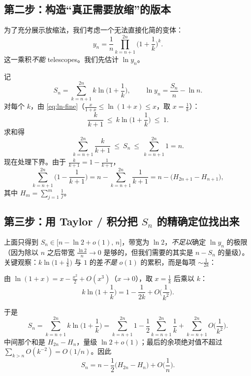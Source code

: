 \documentclass[11pt,a4paper]{ctexart}
\theoremstyle{definition}
\theoremstyle{remark}
\begin{document}
\subsection{第二步：构造“真正需要放缩”的版本}

为了充分展示放缩法，我们考虑一个无法直接化简的变体：
\begin{equation}\label{eq:xn-variant}
  y_n=\frac{1}{n}\prod_{k=n+1}^{2n}\Big(1+\frac1k\Big)^{k}.
\end{equation}
这一乘积\emph{不能} telescopes。我们先估计 $\ln y_n$。

记
\[
  S_n=\sum_{k=n+1}^{2n}k\ln\Big(1+\frac1k\Big),\qquad \ln y_n=\frac{S_n}{n}-\ln n .
\]
对每个 $k$，由 \eqref{eq:ln-fine}（$\frac{x}{1+x}\le\ln(1+x)\le x$，取 $x=\frac1k$）：
\[
  \frac{k}{k+1}\ \le\ k\ln\Big(1+\frac1k\Big)\ \le\ 1 .
\]
求和得
\[
  \sum_{k=n+1}^{2n}\frac{k}{k+1}\ \le\ S_n\ \le\ \sum_{k=n+1}^{2n}1=n .
\]
现在处理下界。由于 $\frac{k}{k+1}=1-\frac{1}{k+1}$，
\[
  \sum_{k=n+1}^{2n}\Big(1-\frac{1}{k+1}\Big)
  =n-\sum_{k=n+1}^{2n}\frac{1}{k+1}
  =n-\Big(H_{2n+1}-H_{n+1}\Big),
\]
其中 $H_m=\sum_{j=1}^{m}\frac1j$。

\subsection{第三步：用 Taylor / 积分把 $S_n$ 的精确定位找出来}

上面只得到 $S_n\in\big[n-\ln 2+o(1),\,n\big]$，带宽为 $\ln 2$，\emph{不足以}确定 $\ln y_n$
的极限（因为除以 $n$ 之后带宽 $\frac{\ln2}{n}\to0$ 是够的，但我们需要的其实是 $n-S_n$ 的量级）。
关键观察：$k\ln\big(1+\frac1k\big)$ 与 $1$ 的差\emph{不是} $o(1)$ 的累积，而是每项 $\sim\frac{1}{2k}$：

\begin{keybox}[核心展开]
由 $\ln(1+x)=x-\frac{x^2}{2}+O(x^3)$（$x\to0$），取 $x=\frac1k$ 后乘以 $k$：
\begin{equation}\label{eq:kln-expand}
  k\ln\Big(1+\frac1k\Big)
  =1-\frac{1}{2k}+O\Big(\frac{1}{k^{2}}\Big).
\end{equation}
\end{keybox}

于是
\[
  S_n=\sum_{k=n+1}^{2n}k\ln\Big(1+\frac1k\Big)
  =\sum_{k=n+1}^{2n}1-\frac12\sum_{k=n+1}^{2n}\frac1k
   +\sum_{k=n+1}^{2n}O\Big(\frac1{k^{2}}\Big).
\]
中间那个和是 $H_{2n}-H_n$，量级 $\ln2+o(1)$；最后的余项绝对值不超过
$\sum_{k>n}O(k^{-2})=O(1/n)$。因此
\begin{equation}\label{eq:Sn-precise}
  S_n=n-\frac12\big(H_{2n}-H_n\big)+O\Big(\frac1n\Big).
\end{equation}
\end{document}

